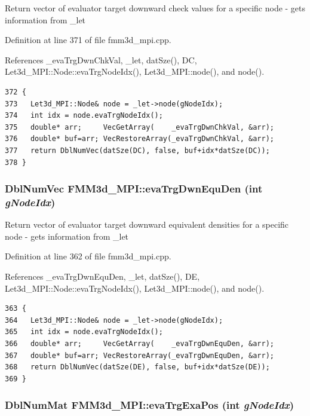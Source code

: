 Return vector of evaluator target downward check values for a specific node - gets information from \_\-let 

Definition at line 371 of file fmm3d\_\-mpi.cpp.

References \_\-eva\-Trg\-Dwn\-Chk\-Val, \_\-let, dat\-Sze(), DC, Let3d\_\-MPI::Node::eva\-Trg\-Node\-Idx(), Let3d\_\-MPI::node(), and node().

\footnotesize\begin{verbatim}372 {
373   Let3d_MPI::Node& node = _let->node(gNodeIdx);
374   int idx = node.evaTrgNodeIdx();
375   double* arr;     VecGetArray(    _evaTrgDwnChkVal, &arr);
376   double* buf=arr; VecRestoreArray(_evaTrgDwnChkVal, &arr);
377   return DblNumVec(datSze(DC), false, buf+idx*datSze(DC));
378 }
\end{verbatim}\normalsize 


\subsubsection{\setlength{\rightskip}{0pt plus 5cm}Dbl\-Num\-Vec FMM3d\_\-MPI::eva\-Trg\-Dwn\-Equ\-Den (int {\em g\-Node\-Idx})\hspace{0.3cm}{\tt  [protected]}}\label{classFMM3d__MPI_37608da100de467c810336918d4d8ce4_37608da100de467c810336918d4d8ce4}


Return vector of evaluator target downward equivalent densities for a specific node - gets information from \_\-let 

Definition at line 362 of file fmm3d\_\-mpi.cpp.

References \_\-eva\-Trg\-Dwn\-Equ\-Den, \_\-let, dat\-Sze(), DE, Let3d\_\-MPI::Node::eva\-Trg\-Node\-Idx(), Let3d\_\-MPI::node(), and node().

\footnotesize\begin{verbatim}363 {
364   Let3d_MPI::Node& node = _let->node(gNodeIdx);
365   int idx = node.evaTrgNodeIdx();
366   double* arr;     VecGetArray(    _evaTrgDwnEquDen, &arr);
367   double* buf=arr; VecRestoreArray(_evaTrgDwnEquDen, &arr);
368   return DblNumVec(datSze(DE), false, buf+idx*datSze(DE));
369 }
\end{verbatim}\normalsize 


\subsubsection{\setlength{\rightskip}{0pt plus 5cm}Dbl\-Num\-Mat FMM3d\_\-MPI::eva\-Trg\-Exa\-Pos (int {\em g\-Node\-Idx})\hspace{0.3cm}{\tt  [protected]}}\label{classFMM3d__MPI_0f6f448334ca927a2dcdfa0ab776bba0_0f6f448334ca927a2dcdfa0ab776bba0}


